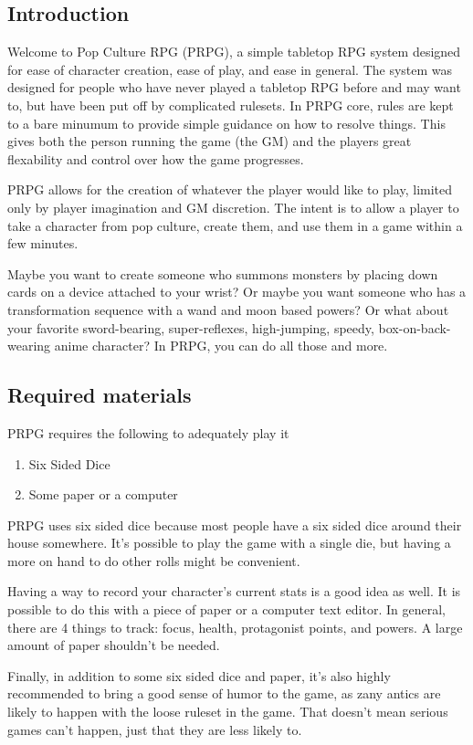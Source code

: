 \begin{flushleft}

\chapter{Introduction} \label{Introduction}

Welcome to Pop Culture RPG (PRPG), a simple tabletop RPG system designed
for ease of character creation, ease of play, and ease in general. The system
was designed for people who have never played a tabletop RPG before and may
want to, but have been put off by complicated rulesets. In PRPG core, rules are
kept to a bare minumum to provide simple guidance on how to resolve things.
This gives both the person running the game (the GM) and the players great
flexability and control over how the game progresses.

PRPG allows for the creation of whatever the player would like to play, limited
only by player imagination and GM discretion. The intent is to allow a player
to take a character from pop culture, create them, and use them in a game
within a few minutes.

Maybe you want to create someone who summons monsters by placing down cards on
a device attached to your wrist? Or maybe you want someone who has a
transformation sequence with a wand and moon based powers? Or what about your
favorite sword-bearing, super-reflexes, high-jumping, speedy,
box-on-back-wearing anime character? In PRPG, you can do all those and more.

\section*{Required materials}

PRPG requires the following to adequately play it

\begin{enumerate}
    \item Six Sided Dice
    \item Some paper or a computer
\end{enumerate}

PRPG uses six sided dice because most people have a six sided dice around
their house somewhere. It's possible to play the game with a single die,
but having a more on hand to do other rolls might be convenient.

Having a way to record your character's current stats is a good idea as well.
It is possible to do this with a piece of paper or a computer text editor. In
general, there are 4 things to track: focus, health, protagonist points, and
powers. A large amount of paper shouldn't be needed.

Finally, in addition to some six sided dice and paper, it's also highly
recommended to bring a good sense of humor to the game, as zany antics are
likely to happen with the loose ruleset in the game. That doesn't mean serious
games can't happen, just that they are less likely to.

\end{flushleft}
